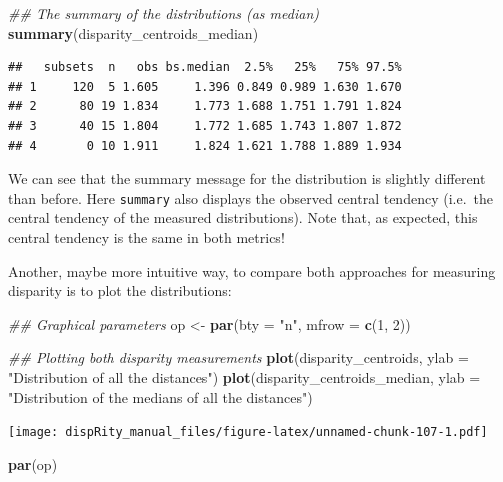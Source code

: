 \documentclass[]{book}
\newenvironment{Shaded}{\begin{snugshade}}{\end{snugshade}}
\newcommand{\CommentTok}[1]{\textcolor[rgb]{0.56,0.35,0.01}{\textit{#1}}}
\newcommand{\DataTypeTok}[1]{\textcolor[rgb]{0.13,0.29,0.53}{#1}}
\newcommand{\DecValTok}[1]{\textcolor[rgb]{0.00,0.00,0.81}{#1}}
\newcommand{\KeywordTok}[1]{\textcolor[rgb]{0.13,0.29,0.53}{\textbf{#1}}}
\newcommand{\NormalTok}[1]{#1}
\newcommand{\StringTok}[1]{\textcolor[rgb]{0.31,0.60,0.02}{#1}}
\begin{document}
\begin{Shaded}
\begin{Highlighting}[]
\CommentTok{## The summary of the distributions (as median)}
\KeywordTok{summary}\NormalTok{(disparity_centroids_median)}
\end{Highlighting}
\end{Shaded}

\begin{verbatim}
##   subsets  n   obs bs.median  2.5%   25%   75% 97.5%
## 1     120  5 1.605     1.396 0.849 0.989 1.630 1.670
## 2      80 19 1.834     1.773 1.688 1.751 1.791 1.824
## 3      40 15 1.804     1.772 1.685 1.743 1.807 1.872
## 4       0 10 1.911     1.824 1.621 1.788 1.889 1.934
\end{verbatim}

We can see that the summary message for the distribution is slightly different than before.
Here \texttt{summary} also displays the observed central tendency (i.e.~the central tendency of the measured distributions).
Note that, as expected, this central tendency is the same in both metrics!

Another, maybe more intuitive way, to compare both approaches for measuring disparity is to plot the distributions:

\begin{Shaded}
\begin{Highlighting}[]
\CommentTok{## Graphical parameters}
\NormalTok{op <-}\StringTok{ }\KeywordTok{par}\NormalTok{(}\DataTypeTok{bty =} \StringTok{"n"}\NormalTok{, }\DataTypeTok{mfrow =} \KeywordTok{c}\NormalTok{(}\DecValTok{1}\NormalTok{, }\DecValTok{2}\NormalTok{))}

\CommentTok{## Plotting both disparity measurements}
\KeywordTok{plot}\NormalTok{(disparity_centroids,}
     \DataTypeTok{ylab =} \StringTok{"Distribution of all the distances"}\NormalTok{)}
\KeywordTok{plot}\NormalTok{(disparity_centroids_median,}
     \DataTypeTok{ylab =} \StringTok{"Distribution of the medians of all the distances"}\NormalTok{)}
\end{Highlighting}
\end{Shaded}

\texttt{[image: dispRity\_manual\_files/figure-latex/unnamed-chunk-107-1.pdf]}

\begin{Shaded}
\begin{Highlighting}[]
\KeywordTok{par}\NormalTok{(op)}
\end{Highlighting}
\end{Shaded}
\end{document}
